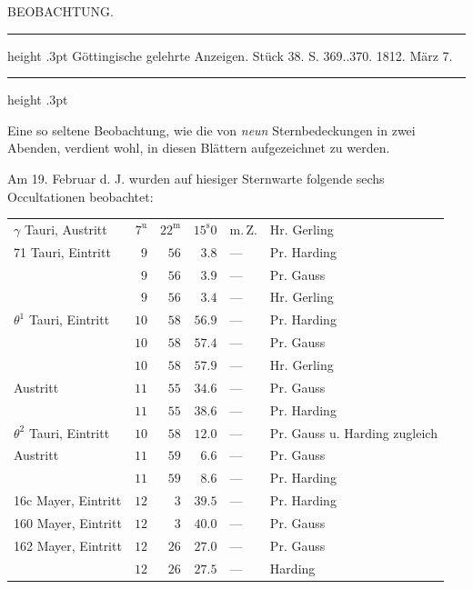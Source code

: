 \par\bigskip
{}
\hypertarget{native-353-lower}{}\label{native-353-lower}
\begin{center}\large BEOBACHTUNG.\end{center}
\begin{center}
\parbox{.77\linewidth}{%
\centering\fontsize{8.2}{10.2}\selectfont
\hrule height .3pt\relax\vspace{2.5pt}
Göttingische gelehrte Anzeigen. Stück 38. S. 369..370. 1812. März 7.\par
\vspace{2.5pt}\hrule height .3pt\relax
}
\end{center}

\par\indent Eine so seltene Beobachtung, wie die von \emph{neun} Sternbedeckungen in zwei Abenden, verdient wohl, in diesen Blättern aufgezeichnet zu werden.

\par\indent Am 19. Februar d. J. wurden auf hiesiger Sternwarte folgende sechs Occultationen beobachtet:

\begin{center}\fontsize{9}{11}\selectfont\setlength{\tabcolsep}{2.5pt}\renewcommand{\arraystretch}{1.15}\begin{tabular}{lrrrll}
$\gamma$ Tauri, Austritt & $7^{\mathrm u}$ & $22^{\mathrm m}$ & $15^{\mathrm s}0$ & m.\,Z. & Hr. Gerling\\
71 Tauri, Eintritt & $9$ & $56$ & $3.8$ & — & Pr. Harding\\
 & $9$ & $56$ & $3.9$ & — & Pr. Gauss\\
 & $9$ & $56$ & $3.4$ & — & Hr. Gerling\\
$\theta^1$ Tauri, Eintritt & $10$ & $58$ & $56.9$ & — & Pr. Harding\\
 & $10$ & $58$ & $57.4$ & — & Pr. Gauss\\
 & $10$ & $58$ & $57.9$ & — & Hr. Gerling\\
Austritt & $11$ & $55$ & $34.6$ & — & Pr. Gauss\\
 & $11$ & $55$ & $38.6$ & — & Pr. Harding\\
$\theta^2$ Tauri, Eintritt & $10$ & $58$ & $12.0$ & — & Pr. Gauss u. Harding zugleich\\
Austritt & $11$ & $59$ & $6.6$ & — & Pr. Gauss\\
 & $11$ & $59$ & $8.6$ & — & Pr. Harding\\
16c Mayer, Eintritt & $12$ & $3$ & $39.5$ & — & Pr. Harding\\
160 Mayer, Eintritt & $12$ & $3$ & $40.0$ & — & Pr. Gauss\\
162 Mayer, Eintritt & $12$ & $26$ & $27.0$ & — & Pr. Gauss\\
 & $12$ & $26$ & $27.5$ & — & Harding\\
\end{tabular}\end{center}

